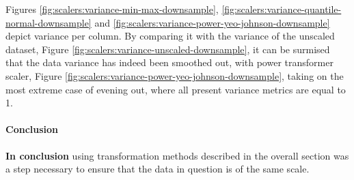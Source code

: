 Figures \ref{fig:scalers:variance-min-max-downsample}, \ref{fig:scalers:variance-quantile-normal-downsample} and \ref{fig:scalers:variance-power-yeo-johnson-downsample} depict variance per column. By comparing it with the variance of the unscaled dataset, Figure \ref{fig:scalers:variance-unscaled-downsample}, it can be surmised that the data variance has indeed been smoothed out, with power transformer scaler, Figure \ref{fig:scalers:variance-power-yeo-johnson-downsample}, taking on the most extreme case of evening out, where all present variance metrics are equal to 1.

\paragraph{Conclusion}\label{sec:scalers:conclusion}
\textbf{In conclusion} using transformation methods described in the overall section was a step necessary to ensure that the data in question is of the same scale. 

\FloatBarrier